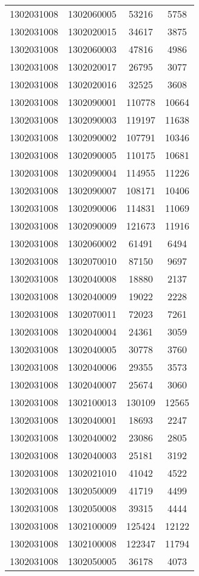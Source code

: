 \begin{longtable}{llcc}
1302031008 & 1302060005 & 53216 & 5758\\
1302031008 & 1302020015 & 34617 & 3875\\
1302031008 & 1302060003 & 47816 & 4986\\
1302031008 & 1302020017 & 26795 & 3077\\
1302031008 & 1302020016 & 32525 & 3608\\
1302031008 & 1302090001 & 110778 & 10664\\
1302031008 & 1302090003 & 119197 & 11638\\
1302031008 & 1302090002 & 107791 & 10346\\
1302031008 & 1302090005 & 110175 & 10681\\
1302031008 & 1302090004 & 114955 & 11226\\
1302031008 & 1302090007 & 108171 & 10406\\
1302031008 & 1302090006 & 114831 & 11069\\
1302031008 & 1302090009 & 121673 & 11916\\
1302031008 & 1302060002 & 61491 & 6494\\
1302031008 & 1302070010 & 87150 & 9697\\
1302031008 & 1302040008 & 18880 & 2137\\
1302031008 & 1302040009 & 19022 & 2228\\
1302031008 & 1302070011 & 72023 & 7261\\
1302031008 & 1302040004 & 24361 & 3059\\
1302031008 & 1302040005 & 30778 & 3760\\
1302031008 & 1302040006 & 29355 & 3573\\
1302031008 & 1302040007 & 25674 & 3060\\
1302031008 & 1302100013 & 130109 & 12565\\
1302031008 & 1302040001 & 18693 & 2247\\
1302031008 & 1302040002 & 23086 & 2805\\
1302031008 & 1302040003 & 25181 & 3192\\
1302031008 & 1302021010 & 41042 & 4522\\
1302031008 & 1302050009 & 41719 & 4499\\
1302031008 & 1302050008 & 39315 & 4444\\
1302031008 & 1302100009 & 125424 & 12122\\
1302031008 & 1302100008 & 122347 & 11794\\
1302031008 & 1302050005 & 36178 & 4073\\

\end{longtable}
